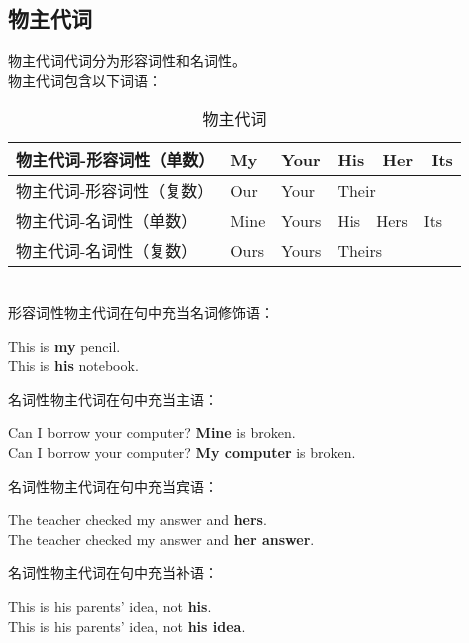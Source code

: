\documentclass[UTF8]{ctexart}
\begin{document}
\subsection{物主代词}
    物主代词代词分为形容词性和名词性。\\[3mm]
    物主代词包含以下词语：\vspace{5pt}
    \begin{table}[h]
        \begin{center}
            \ttfamily
            \begin{tabular}{p{140pt}|p{40pt}|p{40pt}|p{100pt}}
                \hline
                物主代词-形容词性（单数）&My&Your&His~~Her~~Its\\ \hline
                物主代词-形容词性（复数）&Our&Your&Their\\ \hline
                物主代词-名词性（单数）&Mine&Yours&His~~Hers~~Its\\ \hline
                物主代词-名词性（复数）&Ours&Yours&Theirs\\ \hline
            \end{tabular}
            \rmfamily
            \caption{物主代词}
        \end{center}
    \end{table}\\
    形容词性物主代词在句中充当名词修饰语：
    \begin{center}
        \ttfamily\large
        This is \textbf{my} pencil.\\[3mm]
        This is \textbf{his} notebook.\\[6mm]
    \end{center}
    名词性物主代词在句中充当主语：
    \begin{center}
        \ttfamily\large
        Can I borrow your computer? \textbf{Mine} is broken.\\[3mm]
        Can I borrow your computer? \textbf{My computer} is broken.\\[6mm]
    \end{center}
    名词性物主代词在句中充当宾语：
    \begin{center}
        \ttfamily\large
        The teacher checked my answer and \textbf{hers}.\\[3mm]
        The teacher checked my answer and \textbf{her answer}.\\[6mm]
    \end{center}
    名词性物主代词在句中充当补语：
    \begin{center}
        \ttfamily\large
        This is his parents' idea, not \textbf{his}.\\[3mm]
        This is his parents' idea, not \textbf{his idea}.\\[6mm]
    \end{center}
\end{document}
